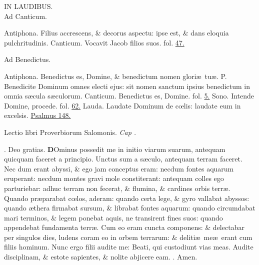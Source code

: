 \documentclass[letter,11pt]{book}
\makeatletter
\DeclareRobustCommand{\Rbar}{\vers@resp{0pt}{R}}
\newcommand{\vers@resp@sym}{\raisebox{0.2ex}{\rotatebox[origin=c]{-20}{$\m@th\rceil$}}}
\newcommand{\vers@resp}[2]{%
  {\ooalign{\hidewidth\kern#1\vers@resp@sym\hidewidth\cr#2\cr}}%
}%
\def\P{\color{Red} P. \color{black}}
\def\R{\color{Red} \Rbar . \color{black}}
\makeatother
\begin{document}
\begin{multicols*}{2}
\begin{center}
IN LAUDIBUS.\\
\color{Red} Ad Canticum.
\end{center}
\vspace{-.75em}
\par \noindent \color{Red} Antiphona. \color{black} Filius accrescens, \& decorus aspectu: ipse est, \& dans eloquia pulchritudinis.
\newline \color{Red} Canticum. \color{black} Vocavit Jacob filios suos. \color{Red} fol. \color{black} \hyperlink{page.47}{47.}
\vspace{-.5em} \begin{center} \color{Red} Ad Benedictus. \color{black} \end{center} \vspace{-.5em}
\par \noindent \color{Red} Antiphona. \color{black} Benedictus es, Domine, \& benedictum nomen glori\ae \ tu\ae . \P Benedicite Dominum omnes electi ejus: sit nomen sanctum ipsius benedictum in omnia s\ae cula s\ae culorum.
\newline \color{Red} Canticum. \color{black} Benedictus es, Domine. \color{Red} fol. \color{black} \hyperlink{page.5}{5.}
\newline \color{Red} Sono. \color{black} Intende Domine, procede. \color{Red} fol. \color{black} \hyperlink{page.62}{62.}
\newline \color{Red} Lauda. \color{black} Laudate Dominum de c\oe lis: laudate eum in excelsis. \color{Red} \hyperlink{ps148}{Psalmus 148.} \color{black}
\vspace{-.5em} \begin{center} {\color{Red} L}ectio libri Proverbiorum Salomonis. \itshape Cap . \color{black} \end{center} \vspace{-.5em}
\par \noindent \R Deo gratias.
\lettrine[lines=2]{\bfseries \color{Red} D}{}Ominus possedit me in initio viarum suarum, antequam quicquam faceret a principio. Unctus sum a s\ae culo, antequam terram faceret. Nec dum erant abyssi, \& ego jam conceptus eram: necdum fontes aquarum eruperant: necdum montes gravi mole constiterant: antequam colles ego parturiebar: adhuc terram non fecerat, \& flumina, \& cardines orbis terr\ae . Quando pr\ae parabat c\oe los, aderam: quando certa lege, \& gyro vallabat abyssos: quando \ae thera firmabat sursum, \& librabat fontes aquarum: quando circumdabat mari terminos, \& legem ponebat aquis, ne transirent fines suos: quando appendebat fundamenta terr\ae . Cum eo eram cuncta componens: \& delectabar per singulos dies, ludens coram eo in orbem terrarum: \& deliti\ae \ me\ae \ erant cum filiis hominum. Nunc ergo filii audite me: Beati, qui custodiunt vias meas. Audite disciplinam, \& estote sapientes, \& nolite abjicere eam. \R Amen.

\end{multicols*}
\end{document}
